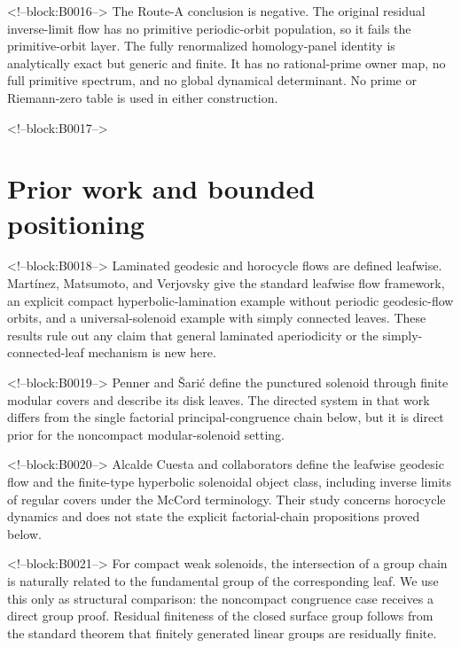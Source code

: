 \documentclass[11pt]{article}
\theoremstyle{definition}
\theoremstyle{remark}
\begin{document}
<!--block:B0016-->
The Route-A conclusion is negative. The original residual inverse-limit flow has no primitive periodic-orbit population, so it fails the primitive-orbit layer. The fully renormalized homology-panel identity is analytically exact but generic and finite. It has no rational-prime owner map, no full primitive spectrum, and no global dynamical determinant. No prime or Riemann-zero table is used in either construction.

<!--block:B0017-->
\section{Prior work and bounded positioning}

<!--block:B0018-->
Laminated geodesic and horocycle flows are defined leafwise. Martínez, Matsumoto, and Verjovsky give the standard leafwise flow framework, an explicit compact hyperbolic-lamination example without periodic geodesic-flow orbits, and a universal-solenoid example with simply connected leaves.
\citep[Section~2.2 and Examples~4, 6]{martinez2016}
These results rule out any claim that general laminated aperiodicity or the simply-connected-leaf mechanism is new here.

<!--block:B0019-->
Penner and Šarić define the punctured solenoid through finite modular covers and describe its disk leaves.
\citep[Introduction and Definition~2.1]{penner2008}
The directed system in that work differs from the single factorial principal-congruence chain below, but it is direct prior for the noncompact modular-solenoid setting.

<!--block:B0020-->
Alcalde Cuesta and collaborators define the leafwise geodesic flow and the finite-type hyperbolic solenoidal object class, including inverse limits of regular covers under the McCord terminology.
\citep[Definitions~4, 5, and 7]{alcalde2026}
Their study concerns horocycle dynamics and does not state the explicit factorial-chain propositions proved below.

<!--block:B0021-->
For compact weak solenoids, the intersection of a group chain is naturally related to the fundamental group of the corresponding leaf.
\citep[Definition~5.5]{hurder2019}
We use this only as structural comparison: the noncompact congruence case receives a direct group proof. Residual finiteness of the closed surface group follows from the standard theorem that finitely generated linear groups are residually finite.
\citep[p.~1]{nica2013}
\end{document}
